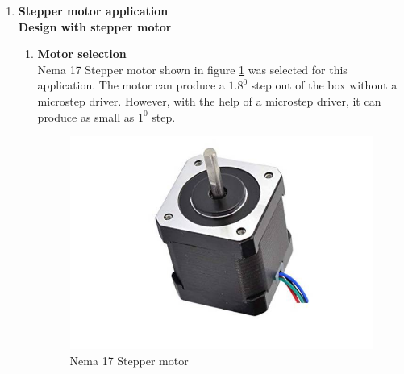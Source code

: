 \begin{enumerate}
    \item \textbf{Stepper motor application}\\
     \textbf{Design with stepper motor}
    \begin{enumerate}
    \item \textbf{Motor selection}\\
     Nema 17 Stepper motor shown in figure \ref{fig:Nema17 Steppper motor} was selected for this application. The motor can produce a $1.8^0$ step out of the box without a microstep driver. However, with the help of a microstep driver, it can produce as small as $1^0$ step.
    \begin{figure}[H]
        \centering
        \includegraphics[width=.3\textwidth, height=.2\textheight]{Figures/Nema17Stepper.jpg}
        \caption[Nema 17 Stepper motor]{Nema 17 Stepper motor \cite{nema17}}
        \label{fig:Nema17 Steppper motor}
    \end{figure}

\end{enumerate}
\end{enumerate}
